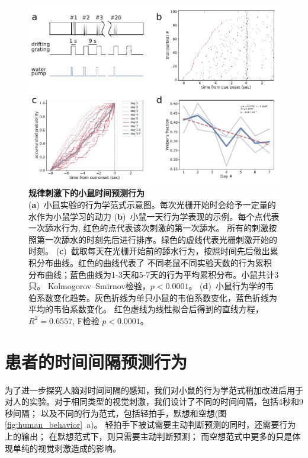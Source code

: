 \begin{figure}[h]
    \begin{center}
    \includegraphics[width=\textwidth]{src/figures/mouse_behavior.pdf}
    \end{center}

    \caption{\textbf{规律刺激下的小鼠时间预测行为}\\
    (\textbf{a})~小鼠实验的行为学范式示意图。每次光栅开始时会给予一定量的水作为小鼠学习的动力
    (\textbf{b})~小鼠一天行为学表现的示例。每个点代表一次舔水行为, 红色的点代表该次刺激的第一次舔水。
    所有的刺激按照第一次舔水的时刻先后进行排序。绿色的虚线代表光栅刺激开始的时刻。
    (\textbf{c})~截取每天在光栅开始前的舔水行为，按照时间先后做出累积分布曲线。红色的曲线代表了
    不同老鼠不同实验天数的行为累积分布曲线；蓝色曲线为1-3天和5-7天的行为平均累积分布。小鼠共计3只。
    Kolmogorov–Smirnov检验，$ p < 0.0001$。
    (\textbf{d})~小鼠行为学的韦伯系数变化趋势。灰色折线为单只小鼠的韦伯系数变化，蓝色折线为平均的韦伯系数变化。
    红色虚线为线性拟合后得到的直线方程，$R^2 = 0.6557$, F检验 $p < 0.0001$。}
    \label{fig:mouse_behavior}
\end{figure}

\section{患者的时间间隔预测行为}
为了进一步探究人脑对时间间隔的感知，我们对小鼠的行为学范式稍加改进后用于
对人的实验。对于相同类型的视觉刺激，我们设计了不同的时间间隔，包括4秒和9秒间隔；
以及不同的行为范式，包括轻拍手，默想和空想(图\ref{fig:human_behavior}~a)。
轻拍手下被试需要主动判断预测的同时，还需要行为上的输出；
在默想范式下，则只需要主动判断预测；
而空想范式中更多的只是体现单纯的视觉刺激造成的影响。

